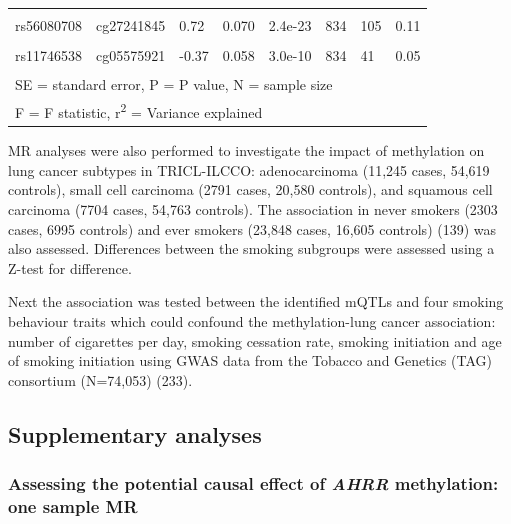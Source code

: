 \documentclass[11pt,oneside]{bristolthesis}
\begin{document}
\begin{table}[!h]
{\begin{tabular}[t]{llllllll}
\cellcolor{gray!6}{rs463924} & \cellcolor{gray!6}{cg26963277} & \cellcolor{gray!6}{-0.39} & \cellcolor{gray!6}{0.045} & \cellcolor{gray!6}{6.8e-18} & \cellcolor{gray!6}{834} & \cellcolor{gray!6}{78} & \cellcolor{gray!6}{0.09}\\
rs56080708 & cg27241845 & 0.72 & 0.070 & 2.4e-23 & 834 & 105 & 0.11\\
\cellcolor{gray!6}{rs11744553} & \cellcolor{gray!6}{cg05575921} & \cellcolor{gray!6}{0.22} & \cellcolor{gray!6}{0.040} & \cellcolor{gray!6}{7.2e-08} & \cellcolor{gray!6}{834} & \cellcolor{gray!6}{30} & \cellcolor{gray!6}{0.03}\\
\addlinespace
rs11746538 & cg05575921 & -0.37 & 0.058 & 3.0e-10 & 834 & 41 & 0.05\\
\bottomrule
\multicolumn{8}{l}{\textsuperscript{} SE = standard error, P = P value, N = sample size}\\
\multicolumn{8}{l}{\textsuperscript{} F = F statistic, r\textsuperscript{2} = Variance explained}\\
\end{tabular}}
\end{table}
\linebreak

MR analyses were also performed to investigate the impact of methylation on lung cancer subtypes in TRICL-ILCCO: adenocarcinoma (11,245 cases, 54,619 controls), small cell carcinoma (2791 cases, 20,580 controls), and squamous cell carcinoma (7704 cases, 54,763 controls). The association in never smokers (2303 cases, 6995 controls) and ever smokers (23,848 cases, 16,605 controls) (139) was also assessed. Differences between the smoking subgroups were assessed using a Z-test for difference.

Next the association was tested between the identified mQTLs and four smoking behaviour traits which could confound the methylation-lung cancer association: number of cigarettes per day, smoking cessation rate, smoking initiation and age of smoking initiation using GWAS data from the Tobacco and Genetics (TAG) consortium (N=74,053) (233).

\hypertarget{methods-supplementary-analyses-07}{%
\subsection{Supplementary analyses}\label{methods-supplementary-analyses-07}}

\hypertarget{ahrr-one-sample-mr-methods}{%
\subsubsection{\texorpdfstring{Assessing the potential causal effect of \emph{AHRR} methylation: one sample MR}{Assessing the potential causal effect of AHRR methylation: one sample MR}}\label{ahrr-one-sample-mr-methods}}
\end{document}

